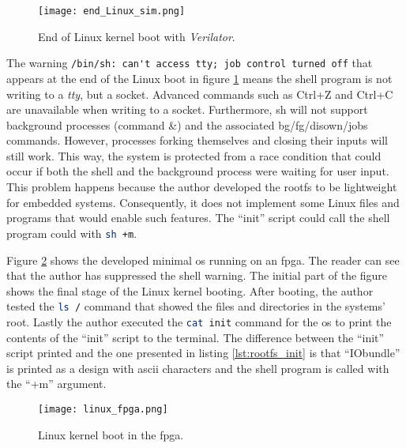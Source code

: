 \begin{figure}[!ht]
    \centering
    \texttt{[image: end\_Linux\_sim.png]}
    \caption{End of Linux kernel boot with \textit{Verilator}.}
    \label{fig:end_linux_verilator}
\end{figure}

The warning \lstinline{/bin/sh: can't access tty; job control turned off} that appears at the end of the Linux boot in figure \ref{fig:end_linux_verilator} means the shell program is not writing to a \textit{tty}, but a socket. Advanced commands such as Ctrl+Z and Ctrl+C are unavailable when writing to a socket. Furthermore, sh will not support background processes (command \&) and the associated bg/fg/disown/jobs commands. However, processes forking themselves and closing their inputs will still work. This way, the system is protected from a race condition that could occur if both the shell and the background process were waiting for user input. This problem happens because the author developed the \acrshort{rootfs} to be lightweight for embedded systems. Consequently, it does not implement some Linux files and programs that would enable such features. The \enquote{init} script could call the shell program could with \lstinline[language=sh]{sh +m}.

Figure \ref{fig:linux_fpga} shows the developed minimal \acrshort{os} running on an \acrshort{fpga}. The reader can see that the author has suppressed the shell warning. The initial part of the figure shows the final stage of the Linux kernel booting. After booting, the author tested the \lstinline[language=sh]{ls /} command that showed the files and directories in the systems' root. Lastly the author executed the \lstinline[language=sh]{cat init} command for the \acrshort{os} to print the contents of the \enquote{init} script to the terminal. The difference between the \enquote{init} script printed and the one presented in listing \ref{lst:rootfs_init} is that \enquote{IObundle} is printed as a design with \acrshort{ascii} characters and the shell program is called with the \enquote{+m} argument.

\begin{figure}[!ht]
    \centering
    \texttt{[image: linux\_fpga.png]}
    \caption{Linux kernel boot in the \acrshort{fpga}.}
    \label{fig:linux_fpga}
\end{figure}


